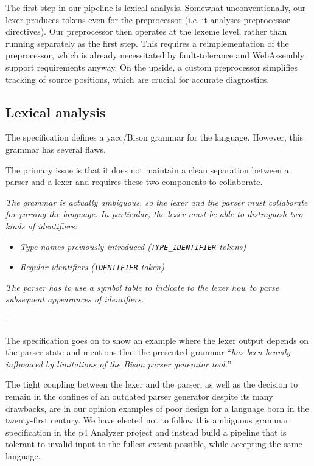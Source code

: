 The first step in our pipeline is lexical analysis. Somewhat unconventionally,
our lexer produces tokens even for the preprocessor (i.e. it analyses
preprocessor directives). Our preprocessor then operates at the lexeme level,
rather than running separately as the first step. This requires a
reimplementation of the preprocessor, which is already necessitated by
fault-tolerance and WebAssembly support requirements anyway. On the upside, a
custom preprocessor simplifies tracking of source positions, which are crucial
for accurate diagnostics.

\subsection{Lexical analysis}

The \pfs specification defines a \acrshort{yacc}/Bison grammar for the language. However, this grammar has
several flaws.

The primary issue is that it does not maintain a clean separation between a
parser and a lexer and requires these two components to collaborate.

\begin{displayquote}
	\textit{The grammar is actually ambiguous, so the lexer and the parser must
	collaborate for parsing the language. In particular, the lexer must be able
	to distinguish two kinds of identifiers:}

	\begin{itemize}
		\item \textit{Type names previously introduced (\texttt{TYPE\_IDENTIFIER}
		tokens)}
		\item \textit{Regular identifiers (\texttt{IDENTIFIER} token)}
	\end{itemize}

	\textit{The parser has to use a symbol table to indicate to the lexer how to
	parse subsequent appearances of identifiers.}

	--  \cite{p416:v123:spec}
\end{displayquote}

The specification goes on to show an example where the lexer output depends on
the parser state and mentions that the presented grammar ``\textit{has been heavily
influenced by limitations of the Bison parser generator tool.}''

The tight coupling between the lexer and the parser, as well as the decision to
remain in the confines of an outdated parser generator despite its many
drawbacks, are in our opinion examples of poor design for a language born in the
twenty-first century. We have elected not to follow this ambiguous grammar
specification in the \acrshort{p4} Analyzer project and instead build a pipeline
that is tolerant to invalid input to the fullest extent possible, while
accepting the same language.

